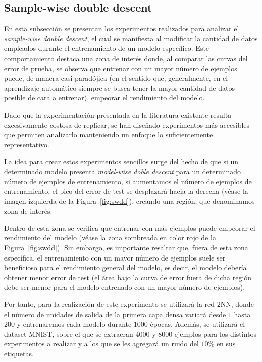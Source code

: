\subsection{Sample-wise double descent}\label{subsec:sample-wise-dd}

En esta subsección se presentan los experimentos realizados para analizar el \textit{sample-wise double descent}, el cual se manifiesta al modificar la cantidad de datos empleados durante el entrenamiento de un modelo específico. Este comportamiento destaca una zona de interés donde, al comparar las curvas del error de prueba, se observa que entrenar con un mayor número de ejemplos puede, de manera casi paradójica (en el sentido que, generalmente, en el aprendizaje automático siempre se busca tener la mayor cantidad de datos posible de cara a entrenar), empeorar el rendimiento del modelo.\newline

Dado que la experimentación presentada en la literatura existente resulta excesivamente costosa de replicar, se han diseñado experimentos más accesibles que permiten analizarlo manteniendo un enfoque lo suficientemente representativo.\newline

La idea para crear estos experimentos sencillos surge del hecho de que si un determinado modelo presenta \textit{model-wise doble descent} para un determinado número de ejemplos de entrenamiento, si aumentamos el número de ejemplos de entrenamiento, el pico del error de test se desplazará hacia la derecha (véase la imagen izquierda de la Figura~\ref{fig:swdd}), creando una región, que denominamos zona de interés.\newline

Dentro de esta zona se verifica que entrenar con más ejemplos puede empeorar el rendimiento del modelo (véase la zona sombreada en color rojo de la Figura~\ref{fig:swdd}). Sin embargo, es importante resaltar que, fuera de esta zona específica, el entrenamiento con un mayor número de ejemplos suele ser beneficioso para el rendimiento general del modelo, es decir, el modelo debería obtener menor error de test (el área bajo la curva de error fuera de dicha región debe ser menor para el modelo entrenado con un mayor número de ejemplos).\newline

Por tanto, para la realización de este experimento se utilizará la red $2$NN, donde el número de unidades de salida de la primera capa densa variará desde $1$ hasta $200$ y entrenaremos cada modelo durante $1000$ épocas. Además, se utilizará el dataset MNIST, sobre el que se extraeran $4000$ y $8000$ ejemplos para los distintos experimentos a realizar y a los que se les agregará un ruido del $10$\% en sus etiquetas.\newline

